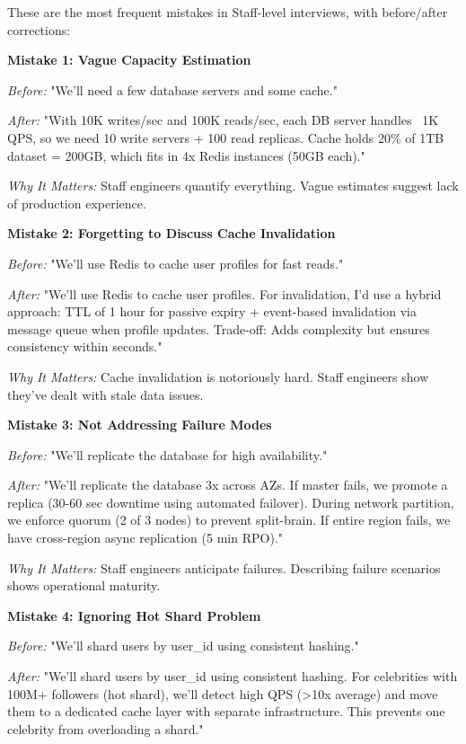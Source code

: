 \documentclass[10pt]{article}
\begin{document}
These are the most frequent mistakes in Staff-level interviews, with before/after corrections:

\textbf{Mistake 1: Vague Capacity Estimation}

\textit{Before:} "We'll need a few database servers and some cache."

\textit{After:} "With 10K writes/sec and 100K reads/sec, each DB server handles ~1K QPS, so we need 10 write servers + 100 read replicas. Cache holds 20\% of 1TB dataset = 200GB, which fits in 4x Redis instances (50GB each)."

\textit{Why It Matters:} Staff engineers quantify everything. Vague estimates suggest lack of production experience.

\textbf{Mistake 2: Forgetting to Discuss Cache Invalidation}

\textit{Before:} "We'll use Redis to cache user profiles for fast reads."

\textit{After:} "We'll use Redis to cache user profiles. For invalidation, I'd use a hybrid approach: TTL of 1 hour for passive expiry + event-based invalidation via message queue when profile updates. Trade-off: Adds complexity but ensures consistency within seconds."

\textit{Why It Matters:} Cache invalidation is notoriously hard. Staff engineers show they've dealt with stale data issues.

\textbf{Mistake 3: Not Addressing Failure Modes}

\textit{Before:} "We'll replicate the database for high availability."

\textit{After:} "We'll replicate the database 3x across AZs. If master fails, we promote a replica (30-60 sec downtime using automated failover). During network partition, we enforce quorum (2 of 3 nodes) to prevent split-brain. If entire region fails, we have cross-region async replication (5 min RPO)."

\textit{Why It Matters:} Staff engineers anticipate failures. Describing failure scenarios shows operational maturity.

\textbf{Mistake 4: Ignoring Hot Shard Problem}

\textit{Before:} "We'll shard users by user\_id using consistent hashing."

\textit{After:} "We'll shard users by user\_id using consistent hashing. For celebrities with 100M+ followers (hot shard), we'll detect high QPS (>10x average) and move them to a dedicated cache layer with separate infrastructure. This prevents one celebrity from overloading a shard."
\end{document}
